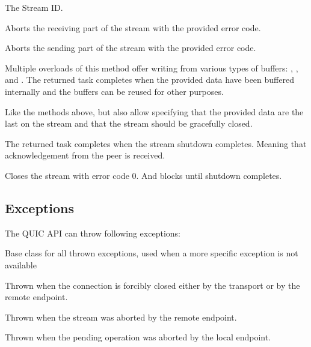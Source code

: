 \begin{description}

     The Stream ID\@.

     Aborts the receiving part of the stream with the provided error code.

     Aborts the sending part of the stream with the provided error code.

     Multiple overloads of this method offer writing from various types of buffers: , , and  . The returned task completes when the provided data have been buffered internally and the buffers can be reused for other purposes.

     Like the methods above, but also allow specifying that the provided data are the last on the stream and that the stream should be gracefully closed.

     The returned task completes when the stream shutdown completes. Meaning that acknowledgement from the peer is received.

     Closes the stream with error code 0. And blocks until shutdown completes.

\end{description}

\subsection{Exceptions}

The QUIC API can throw following exceptions:

\begin{description}

     Base class for all thrown exceptions, used when a more specific exception is not available

     Thrown when the connection is forcibly closed either by the transport or by the remote endpoint.

     Thrown when the stream was aborted by the remote endpoint.

     Thrown when the pending operation was aborted by the local endpoint.

\end{description}

